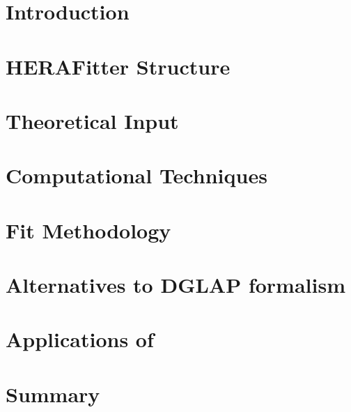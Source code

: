 \tableofcontents
            

\section{Introduction}
\label{sec:intro}

\section{HERAFitter Structure}

\section{Theoretical Input}
\label{sec:theory}



%
\section{Computational Techniques}
\label{sec:techniques}


\section{Fit Methodology}
\label{sec:method}


\section{Alternatives to DGLAP formalism}
\label{sec:alternative}

\section{Applications of \fitter}
\label{sec:examples}



\section{Summary}
\label{sec:outlook}





